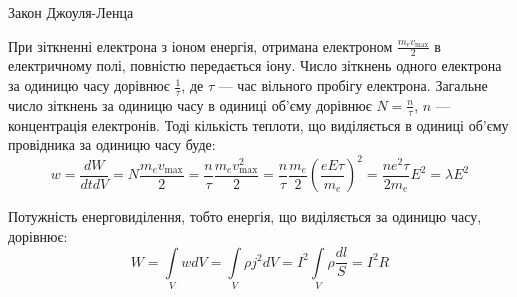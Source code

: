\documentclass[onlytextwidth]{beamer}
\begin{document}
\begin{frame}{Закон Джоуля-Ленца}{}
	\begin{block}{}\justifying
		При зіткненні електрона з іоном енергія, отримана електроном $ \frac{m_e v_{\max}}2$ в електричному полі, повністю передається іону. Число
		зіткнень одного електрона за одиницю часу дорівнює $\frac1{\tau}$, де $\tau$ --- час вільного пробігу електрона. Загальне число зіткнень за
		одиницю часу в одиниці об'єму дорівнює $N = \frac{n}{\tau}$, $n$ --- концентрація електронів. Тоді кількість теплоти, що виділяється в одиниці об'єму
		провідника за одиницю часу буде:
		\begin{equation*}
			w = \frac{dW}{dt dV} = N \frac{m_e v_{\max}}2 = \frac{n}\tau \frac{m_e v^2_{\max}}2 =
			\frac{n}\tau \frac{m_e}2 \left( \frac{eE\tau}{m_e} \right)^2 =  \frac{ne^2\tau}{2m_e} E^2 = \lambda E^2
		\end{equation*}

		Потужність енерговиділення, тобто енергія, що виділяється за одиницю часу, дорівнює:
		\begin{equation*}
			W = \int\limits_V w dV = \int\limits_V \rho j^2 dV = I^2 \int\limits_V \rho\frac{dl}{S} = I^2 R
		\end{equation*}

	\end{block}
\end{frame}
\end{document}
